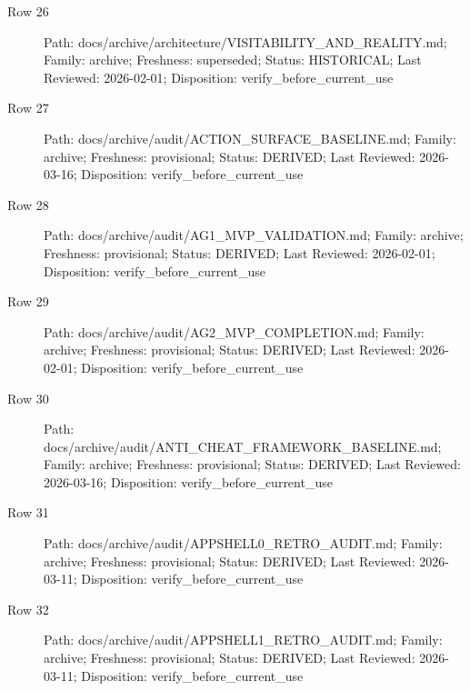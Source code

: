 \documentclass[10.5pt,a4paper,openany]{book}
\begin{document}
\begin{description}
\item[Row 26] Path: docs/\allowbreak{}archive/\allowbreak{}architecture/\allowbreak{}VISITABILITY\_\allowbreak{}AND\_\allowbreak{}REALITY.\allowbreak{}md; Family: archive; Freshness: superseded; Status: HISTORICAL; Last Reviewed: 2026-\allowbreak{}02-\allowbreak{}01; Disposition: verify\_\allowbreak{}before\_\allowbreak{}current\_\allowbreak{}use
\item[Row 27] Path: docs/\allowbreak{}archive/\allowbreak{}audit/\allowbreak{}ACTION\_\allowbreak{}SURFACE\_\allowbreak{}BASELINE.\allowbreak{}md; Family: archive; Freshness: provisional; Status: DERIVED; Last Reviewed: 2026-\allowbreak{}03-\allowbreak{}16; Disposition: verify\_\allowbreak{}before\_\allowbreak{}current\_\allowbreak{}use
\item[Row 28] Path: docs/\allowbreak{}archive/\allowbreak{}audit/\allowbreak{}AG1\_\allowbreak{}MVP\_\allowbreak{}VALIDATION.\allowbreak{}md; Family: archive; Freshness: provisional; Status: DERIVED; Last Reviewed: 2026-\allowbreak{}02-\allowbreak{}01; Disposition: verify\_\allowbreak{}before\_\allowbreak{}current\_\allowbreak{}use
\item[Row 29] Path: docs/\allowbreak{}archive/\allowbreak{}audit/\allowbreak{}AG2\_\allowbreak{}MVP\_\allowbreak{}COMPLETION.\allowbreak{}md; Family: archive; Freshness: provisional; Status: DERIVED; Last Reviewed: 2026-\allowbreak{}02-\allowbreak{}01; Disposition: verify\_\allowbreak{}before\_\allowbreak{}current\_\allowbreak{}use
\item[Row 30] Path: docs/\allowbreak{}archive/\allowbreak{}audit/\allowbreak{}ANTI\_\allowbreak{}CHEAT\_\allowbreak{}FRAMEWORK\_\allowbreak{}BASELINE.\allowbreak{}md; Family: archive; Freshness: provisional; Status: DERIVED; Last Reviewed: 2026-\allowbreak{}03-\allowbreak{}16; Disposition: verify\_\allowbreak{}before\_\allowbreak{}current\_\allowbreak{}use
\item[Row 31] Path: docs/\allowbreak{}archive/\allowbreak{}audit/\allowbreak{}APPSHELL0\_\allowbreak{}RETRO\_\allowbreak{}AUDIT.\allowbreak{}md; Family: archive; Freshness: provisional; Status: DERIVED; Last Reviewed: 2026-\allowbreak{}03-\allowbreak{}11; Disposition: verify\_\allowbreak{}before\_\allowbreak{}current\_\allowbreak{}use
\item[Row 32] Path: docs/\allowbreak{}archive/\allowbreak{}audit/\allowbreak{}APPSHELL1\_\allowbreak{}RETRO\_\allowbreak{}AUDIT.\allowbreak{}md; Family: archive; Freshness: provisional; Status: DERIVED; Last Reviewed: 2026-\allowbreak{}03-\allowbreak{}11; Disposition: verify\_\allowbreak{}before\_\allowbreak{}current\_\allowbreak{}use

\end{description}
\end{document}
